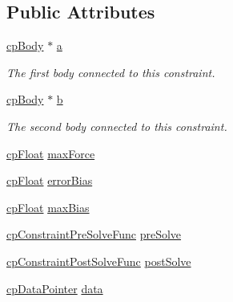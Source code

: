 \subsection*{Public Attributes}
\begin{DoxyCompactItemize}
\item 
\hypertarget{structcp_constraint_a5740b2723545d943c2f45263e27fb9dd}{\hyperlink{structcp_body}{cp\-Body} $\ast$ \hyperlink{structcp_constraint_a5740b2723545d943c2f45263e27fb9dd}{a}}\label{structcp_constraint_a5740b2723545d943c2f45263e27fb9dd}

\begin{DoxyCompactList}\small\item\em The first body connected to this constraint. \end{DoxyCompactList}\item 
\hypertarget{structcp_constraint_aafa95efc3bad5b2f86f9db87b284cae7}{\hyperlink{structcp_body}{cp\-Body} $\ast$ \hyperlink{structcp_constraint_aafa95efc3bad5b2f86f9db87b284cae7}{b}}\label{structcp_constraint_aafa95efc3bad5b2f86f9db87b284cae7}

\begin{DoxyCompactList}\small\item\em The second body connected to this constraint. \end{DoxyCompactList}\item 
\hyperlink{group__basic_types_gac1ed65573e035bf892505768c852d8d3}{cp\-Float} \hyperlink{structcp_constraint_a993d4e5c9439d7b913bd391e955e0e5b}{max\-Force}
\item 
\hyperlink{group__basic_types_gac1ed65573e035bf892505768c852d8d3}{cp\-Float} \hyperlink{structcp_constraint_a4cfd0b995f500090fc5811635ed57614}{error\-Bias}
\item 
\hyperlink{group__basic_types_gac1ed65573e035bf892505768c852d8d3}{cp\-Float} \hyperlink{structcp_constraint_aac8ae38ee220e975dc4abbee86996e62}{max\-Bias}
\item 
\hyperlink{group__cp_constraint_ga31a2ad1ca9b9ecd4124a81b1292714e0}{cp\-Constraint\-Pre\-Solve\-Func} \hyperlink{structcp_constraint_a4a9e75379d50abaf80662cad350324d6}{pre\-Solve}
\item 
\hyperlink{group__cp_constraint_ga1adf3ccceb908229069aa2f10f21c1b1}{cp\-Constraint\-Post\-Solve\-Func} \hyperlink{structcp_constraint_a1be309feb59902e01cfcaeb5f6696930}{post\-Solve}
\item 
\hyperlink{group__basic_types_ga2ac2c3c31e21893941f9e4f8ee279447}{cp\-Data\-Pointer} \hyperlink{structcp_constraint_ae2adf6ccf6a057e05fa6eaf1d6843052}{data}
\end{DoxyCompactItemize}


